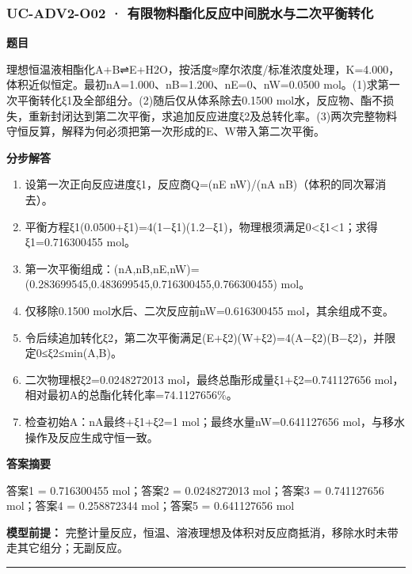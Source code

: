 \documentclass[UTF8,11pt,a4paper]{ctexart}
\begin{document}
\subsubsection*{UC-ADV2-O02 · 有限物料酯化反应中间脱水与二次平衡转化}
\noindent\textbf{题目}\par
理想恒温液相酯化A+B⇌E+H2O，按活度≈摩尔浓度/标准浓度处理，K=4.000，体积近似恒定。最初nA=1.000、nB=1.200、nE=0、nW=0.0500 mol。(1)求第一次平衡转化ξ1及全部组分。(2)随后仅从体系除去0.1500 mol水，反应物、酯不损失，重新封闭达到第二次平衡，求追加反应进度ξ2及总转化率。(3)两次完整物料守恒反算，解释为何必须把第一次形成的E、W带入第二次平衡。\par
\medskip\noindent\textbf{分步解答}
\begin{enumerate}
\item 设第一次正向反应进度ξ1，反应商Q=(nE nW)/(nA nB)（体积的同次幂消去）。
\item 平衡方程ξ1(0.0500+ξ1)=4(1−ξ1)(1.2−ξ1)，物理根须满足0<ξ1<1；求得ξ1=0.716300455 mol。
\item 第一次平衡组成：(nA,nB,nE,nW)=(0.283699545,0.483699545,0.716300455,0.766300455) mol。
\item 仅移除0.1500 mol水后、二次反应前nW=0.616300455 mol，其余组成不变。
\item 令后续追加转化ξ2，第二次平衡满足(E+ξ2)(W+ξ2)=4(A−ξ2)(B−ξ2)，并限定0≤ξ2≤min(A,B)。
\item 二次物理根ξ2=0.0248272013 mol，最终总酯形成量ξ1+ξ2=0.741127656 mol，相对最初A的总酯化转化率=74.1127656\%。
\item 检查初始A：nA最终+ξ1+ξ2=1 mol；最终水量nW=0.641127656 mol，与移水操作及反应生成守恒一致。
\end{enumerate}
\noindent\textbf{答案摘要}\par
答案1 = 0.716300455 mol；答案2 = 0.0248272013 mol；答案3 = 0.741127656 mol；答案4 = 0.258872344 mol；答案5 = 0.641127656 mol\par
\noindent\textbf{模型前提：}
完整计量反应，恒温、溶液理想及体积对反应商抵消，移除水时未带走其它组分；无副反应。\par
\medskip\hrule\medskip
{}
\end{document}
